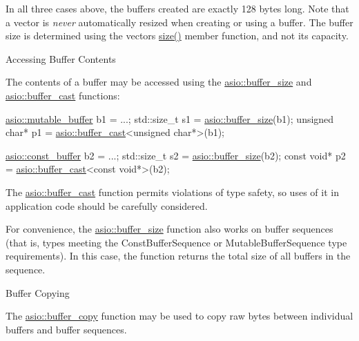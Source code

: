 In all three cases above, the buffers created are exactly 128 bytes long. Note that a vector is {\itshape never} automatically resized when creating or using a buffer. The buffer size is determined using the vector\textquotesingle{}s {\ttfamily \hyperlink{namespaceuva_1_1utils_1_1containers_aea6a0a858974dd7edb4227dcbcbc1eb6a0be5bdf7cf8c7c58d0bc5678caa07791}{size()}} member function, and not its capacity.

\begin{DoxyParagraph}{Accessing Buffer Contents}

\end{DoxyParagraph}
The contents of a buffer may be accessed using the \hyperlink{group__buffer__size}{asio\+::buffer\+\_\+size} and \hyperlink{group__buffer__cast}{asio\+::buffer\+\_\+cast} functions\+:


\begin{DoxyCode}
 \hyperlink{classasio_1_1mutable__buffer}{asio::mutable\_buffer} b1 = ...;
std::size\_t s1 = \hyperlink{group__buffer__size_gabe8b5f116fbb66004b6d0ba8ee39c3d5}{asio::buffer\_size}(b1);
\textcolor{keywordtype}{unsigned} \textcolor{keywordtype}{char}* p1 = \hyperlink{group__buffer__cast_ga6faa5f9daa2512cc9c3cefa8b5ab0704}{asio::buffer\_cast}<\textcolor{keywordtype}{unsigned} \textcolor{keywordtype}{char}*>(b1);

\hyperlink{classasio_1_1const__buffer}{asio::const\_buffer} b2 = ...;
std::size\_t s2 = \hyperlink{group__buffer__size_gabe8b5f116fbb66004b6d0ba8ee39c3d5}{asio::buffer\_size}(b2);
\textcolor{keyword}{const} \textcolor{keywordtype}{void}* p2 = \hyperlink{group__buffer__cast_ga6faa5f9daa2512cc9c3cefa8b5ab0704}{asio::buffer\_cast}<\textcolor{keyword}{const} \textcolor{keywordtype}{void}*>(b2); 
\end{DoxyCode}


The \hyperlink{group__buffer__cast_ga6faa5f9daa2512cc9c3cefa8b5ab0704}{asio\+::buffer\+\_\+cast} function permits violations of type safety, so uses of it in application code should be carefully considered.

For convenience, the \hyperlink{group__buffer__size}{asio\+::buffer\+\_\+size} function also works on buffer sequences (that is, types meeting the Const\+Buffer\+Sequence or Mutable\+Buffer\+Sequence type requirements). In this case, the function returns the total size of all buffers in the sequence.

\begin{DoxyParagraph}{Buffer Copying}

\end{DoxyParagraph}
The \hyperlink{group__buffer__copy}{asio\+::buffer\+\_\+copy} function may be used to copy raw bytes between individual buffers and buffer sequences.

